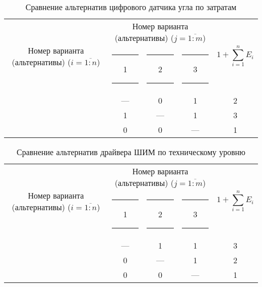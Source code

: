 \begin{table}[ht!]
    \centering
    \begin{tabular}{|c|c|c|c|c|}
        \hline
        \multirow{2}{2.4cm}[-0.5pc]{
            \centering
            Номер варианта (альтернативы) ($i = \overline{1:n}$)
        } &
        \multicolumn{3}{c|}{
            \parbox[t]{2.4cm}{
                \centering
                Номер варианта (альтернативы) ($j = \overline{1:m}$)
            }
        } &
        \multirow{2}{1.7cm}{
            \centering
            $$1 + \sum_{i=1}^n E_i$$
        } \\
        &
        \centering \rule{2pt}{0pt} 1 \rule{2pt}{0pt} &
        \centering \rule{2pt}{0pt} 2 \rule{2pt}{0pt} &
        \centering \rule{2pt}{0pt} 3 \rule{2pt}{0pt} & \\
        \hline \hline
        \centering{1} &---& 0 & 1 & 2 \\ \hline
        \centering{2} & 1 &---& 1 & 3 \\ \hline
        \centering{3} & 0 & 0 &---& 1 \\ \hline
    \end{tabular}
    \caption{Сравнение альтернатив цифрового датчика угла по затратам}
    \label{tbl_sensor_cost_lvl_comparison}
\end{table}

\begin{table}[ht!]
    \centering
    \begin{tabular}{|c|c|c|c|c|}
        \hline
        \multirow{2}{2.4cm}[-0.5pc]{
            \centering
            Номер варианта (альтернативы) ($i = \overline{1:n}$)
        } &
        \multicolumn{3}{c|}{
            \parbox[t]{2.4cm}{
                \centering
                Номер варианта (альтернативы) ($j = \overline{1:m}$)
            }
        } &
        \multirow{2}{1.7cm}{
            \centering
            $$1 + \sum_{i=1}^n E_i$$
        } \\
        &
        \centering \rule{2pt}{0pt} 1 \rule{2pt}{0pt} &
        \centering \rule{2pt}{0pt} 2 \rule{2pt}{0pt} &
        \centering \rule{2pt}{0pt} 3 \rule{2pt}{0pt} & \\
        \hline \hline
        \centering{1} &---& 1 & 1 & 3 \\ \hline
        \centering{2} & 0 &---& 1 & 2 \\ \hline
        \centering{3} & 0 & 0 &---& 1 \\ \hline
    \end{tabular}
    \caption{Сравнение альтернатив драйвера ШИМ по техническому уровню}
    \label{tbl_drv_tech_lvl_comparison}
\end{table}

